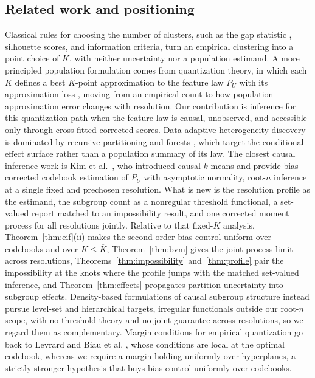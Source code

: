 \documentclass[11pt]{article}
\begin{document}
\subsection{Related work and positioning}\label{sec:intro:related}

Classical rules for choosing the number of clusters, such as the gap statistic \citep{tibshirani2001}, silhouette scores, and information criteria, turn an empirical clustering into a point choice of $K$, with neither uncertainty nor a population estimand. A more principled population formulation comes from quantization theory, in which each $K$ defines a best $K$-point approximation to the feature law $P_U$ with its approximation loss \citep{pollard1981,graf2000,bartlett1998}, moving from an empirical count to how population approximation error changes with resolution. Our contribution is inference for this quantization path when the feature law is causal, unobserved, and accessible only through cross-fitted corrected scores. Data-adaptive heterogeneity discovery is dominated by recursive partitioning and forests \citep{athey2016,wager2018}, which target the conditional effect surface rather than a population summary of its law. The closest causal inference work is Kim et al.\ \cite{kim2026causal}, who introduced causal $k$-means and provide bias-corrected codebook estimation of $P_U$ with asymptotic normality, root-$n$ inference at a single fixed and prechosen resolution. What is new is the resolution profile as the estimand, the subgroup count as a nonregular threshold functional, a set-valued report matched to an impossibility result, and one corrected moment process for all resolutions jointly. Relative to that fixed-$K$ analysis, Theorem~\ref{thm:eif}(ii) makes the second-order bias control uniform over codebooks and over $K\le\overline K$, Theorem~\ref{thm:bvm} gives the joint process limit across resolutions, Theorems~\ref{thm:impossibility} and~\ref{thm:profile} pair the impossibility at the knots where the profile jumps with the matched set-valued inference, and Theorem~\ref{thm:effects} propagates partition uncertainty into subgroup effects. Density-based formulations of causal subgroup structure \citep{kim2024hierarchical} instead pursue level-set and hierarchical targets, irregular functionals outside our root-$n$ scope, with no threshold theory and no joint guarantee across resolutions, so we regard them as complementary. Margin conditions for empirical quantization go back to Levrard \cite{levrard2015} and Biau et al. \cite{biau2008}, whose conditions are local at the optimal codebook, whereas we require a margin holding uniformly over hyperplanes, a strictly stronger hypothesis that buys bias control uniformly over codebooks.
\end{document}
